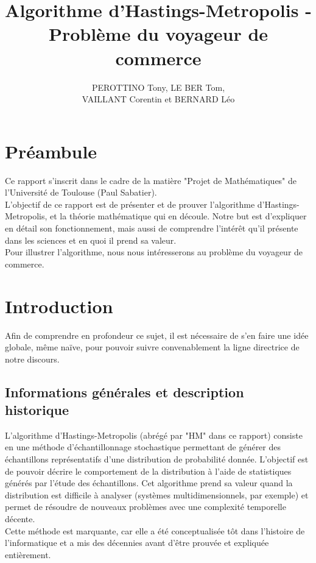 \documentclass{article}
\title{Algorithme d'Hastings-Metropolis - Problème du voyageur de commerce}
\author{PEROTTINO Tony, LE BER Tom, \\ VAILLANT Corentin et BERNARD Léo}
\begin{document}
\maketitle

\newpage
\tableofcontents
\newpage

\section*{Préambule}

Ce rapport s'inscrit dans le cadre de la matière "Projet de Mathématiques" de l'Université de Toulouse (Paul Sabatier). \\
L'objectif de ce rapport est de présenter et de prouver l'algorithme d'Hastings-Metropolis, et la théorie mathématique qui en découle.
Notre but est d'expliquer en détail son fonctionnement, mais aussi de comprendre l'intérêt qu'il présente dans les sciences et en quoi il prend sa valeur. \\
Pour illustrer l'algorithme, nous nous intéresserons au problème du voyageur de commerce.


\section{Introduction}

Afin de comprendre en profondeur ce sujet, il est nécessaire de s'en faire une idée globale, même naïve, pour pouvoir suivre convenablement la ligne directrice de notre discours.

\subsection{Informations générales et description historique}

L'algorithme d'Hastings-Metropolis (abrégé par "HM" dans ce rapport) consiste en une méthode d'échantillonnage stochastique permettant de générer des échantillons représentatifs d'une distribution de probabilité donnée. L'objectif est de pouvoir décrire le comportement de la distribution à l'aide de statistiques générés par l'étude des échantillons.
Cet algorithme prend sa valeur quand la distribution est difficile à analyser (systèmes multidimensionnels, par exemple) et permet de résoudre de nouveaux problèmes avec une complexité temporelle décente. \\
Cette méthode est marquante, car elle a été conceptualisée tôt dans l'histoire de l'informatique et a mis des décennies avant d'être prouvée et expliquée entièrement. \\
\end{document}
